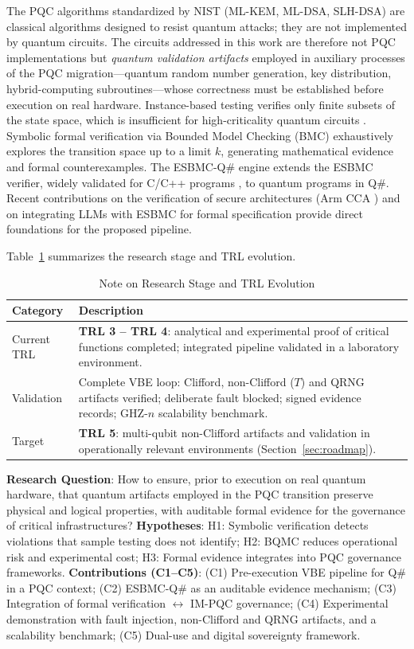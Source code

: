 \documentclass[journal]{IEEEtran} %
\begin{document}
The PQC algorithms standardized by NIST (ML-KEM, ML-DSA, SLH-DSA) are classical algorithms designed to resist quantum attacks; they are not implemented by quantum circuits. The circuits addressed in this work are therefore not PQC implementations but \textit{quantum validation artifacts} employed in auxiliary processes of the PQC migration---quantum random number generation, key distribution, hybrid-computing subroutines---whose correctness must be established before execution on real hardware. Instance-based testing verifies only finite subsets of the state space, which is insufficient for high-criticality quantum circuits \cite{ref7}. Symbolic formal verification via Bounded Model Checking (BMC) exhaustively explores the transition space up to a limit $k$, generating mathematical evidence and formal counterexamples. The ESBMC-Q\# engine extends the ESBMC verifier, widely validated for C/C++ programs \cite{ref8,ref9,ref10}, to quantum programs in Q\#. Recent contributions on the verification of secure architectures (Arm CCA \cite{ref12}) and on integrating LLMs with ESBMC for formal specification \cite{ref13} provide direct foundations for the proposed pipeline.

Table~\ref{tab:trl} summarizes the research stage and TRL evolution.

\begin{table}[!t]
\centering
\caption{Note on Research Stage and TRL Evolution}
\label{tab:trl}
\footnotesize
\begin{tabularx}{\columnwidth}{@{}lX@{}}
\toprule
\textbf{Category} & \textbf{Description} \\
\midrule
Current TRL & \textbf{TRL 3 -- TRL 4}: analytical and experimental proof of critical functions completed; integrated pipeline validated in a laboratory environment. \\
Validation & Complete VBE loop: Clifford, non-Clifford ($T$) and QRNG artifacts verified; deliberate fault blocked; signed evidence records; GHZ-$n$ scalability benchmark. \\
Target & \textbf{TRL 5}: multi-qubit non-Clifford artifacts and validation in operationally relevant environments (Section~\ref{sec:roadmap}). \\
\bottomrule
\end{tabularx}
\end{table}

\textbf{Research Question}: How to ensure, prior to execution on real quantum hardware, that quantum artifacts employed in the PQC transition preserve physical and logical properties, with auditable formal evidence for the governance of critical infrastructures? \textbf{Hypotheses}: H1: Symbolic verification detects violations that sample testing does not identify; H2: BQMC reduces operational risk and experimental cost; H3: Formal evidence integrates into PQC governance frameworks.
\textbf{Contributions (C1--C5)}:
(C1) Pre-execution VBE pipeline for Q\# in a PQC context;
(C2) ESBMC-Q\# as an auditable evidence mechanism;
(C3) Integration of formal verification $\leftrightarrow$ IM-PQC governance;
(C4) Experimental demonstration with fault injection, non-Clifford and QRNG artifacts, and a scalability benchmark;
(C5) Dual-use and digital sovereignty framework.
\end{document}
